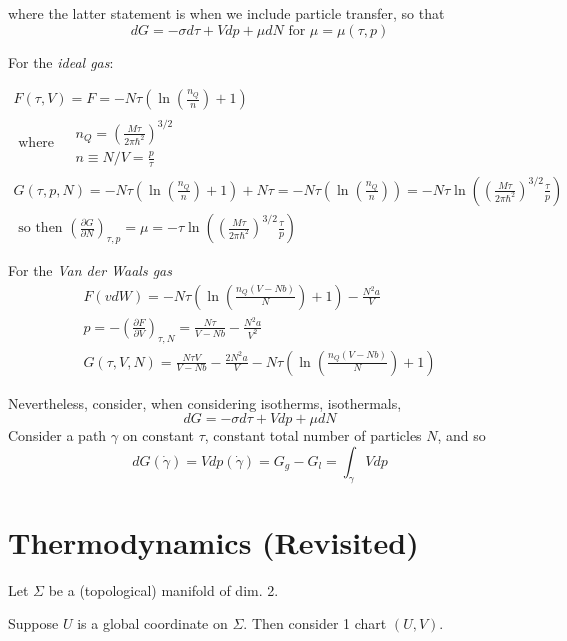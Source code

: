 \documentclass[10pt]{amsart}
\begin{document}
\begin{multicols*}{2}
where the latter statement is when we include particle transfer, so that 
\[
dG = -\sigma d\tau + Vdp + \mu dN \text{ for } \mu = \mu(\tau,p)
\]

For the \emph{ideal gas}:

\[
\begin{gathered}
  F(\tau,V) = F= -N\tau \left( \ln{ \left( \frac{n_Q}{n} \right)} + 1 \right) \\ 
  \text{ where }  \begin{aligned}
    & n_Q = \left( \frac{M\tau }{2\pi \hbar^2 } \right)^{3/2} \\ 
    & n \equiv N/V = \frac{p}{\tau} 
  \end{aligned} \\
  G(\tau,p, N) = -N \tau ( \ln{ \left( \frac{n_Q}{n} \right) } + 1 ) + N \tau = - N\tau ( \ln{ \left( \frac{n_Q}{n} \right) } ) = -N\tau \ln{ \left( \left( \frac{M\tau}{2\pi \hbar^2 } \right)^{3/2} \frac{\tau}{p} \right) } \\
  \text{ so then }
\left( \frac{ \partial G}{ \partial N} \right)_{\tau,p} = \mu = -\tau \ln{ \left( \left( \frac{M\tau}{2\pi \hbar^2} \right)^{3/2} \frac{\tau}{p} \right) }
\end{gathered}
\]

For the \emph{Van der Waals gas}
\[
\begin{gathered}
  F(vdW) = -N\tau \left( \ln{ \left( \frac{n_Q (V-Nb)}{N} \right) }  + 1 \right) - \frac{N^2 a }{V} \\ 
  p = -\left( \frac{\partial F}{ \partial V} \right)_{\tau,N} = \frac{N\tau}{V-Nb} - \frac{N^2a}{V^2} \\
  G(\tau,V,N) = \frac{N\tau V}{ V-Nb} - \frac{2N^2 a}{V} - N\tau ( \ln{ \left( \frac{n_Q (V-Nb)}{N} \right) } + 1 )
\end{gathered}
\]

Nevertheless, consider, when considering isotherms, isothermals, 
\[
dG = -\sigma d\tau  + Vdp + \mu dN
\]
Consider a path $\gamma$ on constant $\tau$, constant total number of particles $N$, and so
\[
dG(\dot{\gamma}) = Vdp(\dot{\gamma}) = G_g-G_l = \int_{\gamma} Vdp
\]


\part{Thermodynamics (Revisited)}

Let $\Sigma$ be a (topological) manifold of dim. 2.  

Suppose $U$ is a global coordinate on $\Sigma$.  Then consider 1 chart $(U,V)$.  


\end{multicols*}
\end{document}
